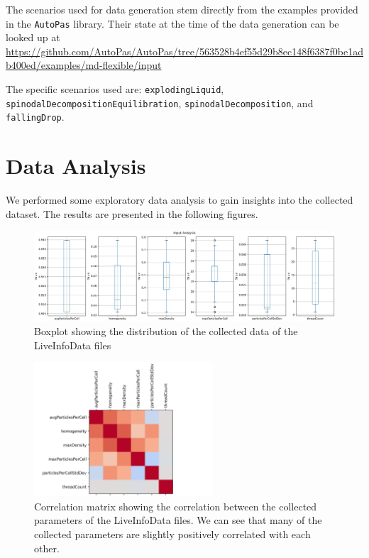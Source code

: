 The scenarios used for data generation stem directly from the examples provided in the \texttt{AutoPas} library. Their state at the time of the data generation can be looked up at \small{
  \url{
    https://github.com/AutoPas/AutoPas/tree/563528b4ef55d29b8ec148f6387f0be1adb400ed/examples/md-flexible/input
  }
}

The specific scenarios used are: \texttt{explodingLiquid}, \texttt{spinodalDecompositionEquilibration}, \texttt{spinodalDecomposition}, and \texttt{fallingDrop}.


\section{Data Analysis}

We performed some exploratory data analysis to gain insights into the collected dataset. The results are presented in the following figures.

\begin{figure}[H]
  \centering
  \includegraphics[width=\columnwidth,trim={0 0 0 0.5cm},clip]{figures/DataAnalytics/input_analysis.png}
  \caption[Boxplot of the collected Dataset]{Boxplot showing the distribution of the collected data of the LiveInfoData files}
  \label{fig:inputAnalysisBoxplot}
\end{figure}

\begin{figure}[H]
  \centering
  \includegraphics[height=5cm,trim={0cm 0 2cm 0cm},clip]{figures/DataAnalytics/correlation_matrix.png}
  \caption[Correlation Matrix of the collected Dataset]{Correlation matrix showing the correlation between the collected parameters of the LiveInfoData files. We can see that many of the collected parameters are slightly positively correlated with each other.}
  \label{fig:corrMatrix}
\end{figure}

